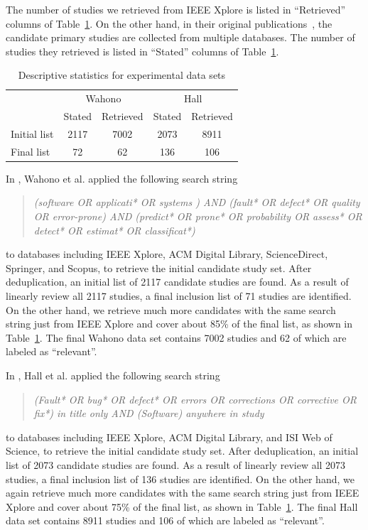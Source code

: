 \documentclass[final,twocolumn,5p]{elsarticle}
\theoremstyle{break}
\begin{document}
The number of studies we retrieved from IEEE Xplore is listed in ``Retrieved'' columns of Table~\ref{tab: number}. On the other hand, in their original publications~\cite{wahono2015systematic,hall2012systematic}, the candidate primary studies are collected from multiple databases. The number of studies they retrieved is listed in ``Stated'' columns of Table~\ref{tab: number}.

\begin{table}
\caption{Descriptive statistics for experimental data sets}
\label{tab: number}
\begin{center}
\begin{tabular}{ |l|c|c|c|c| }
  \hline
   & \multicolumn{2}{|c|}{Wahono} & \multicolumn{2}{|c|}{Hall}\\
  \cline{2-5}
  & Stated & Retrieved & Stated & Retrieved\\
  \hline
  Initial list & 2117 & 7002 & 2073 & 8911\\
  \hline
  Final list & 72 & 62 & 136 & 106 \\
  \hline
\end{tabular}
\end{center}
\end{table}


In \cite{wahono2015systematic}, Wahono et al. applied the following search string
\begin{quote}\textit{(software OR applicati* OR systems ) AND (fault* OR
defect* OR quality OR error-prone) AND (predict*
OR prone* OR probability OR assess* OR detect* OR
estimat* OR classificat*)}
\end{quote}
to databases including IEEE Xplore, ACM Digital Library, ScienceDirect, Springer, and Scopus, to retrieve the initial candidate study set. After deduplication, an initial list of 2117 candidate studies are found. As a result of linearly review all 2117 studies, a final inclusion list of 71 studies are identified. On the other hand, we retrieve much more candidates with the same search string just from IEEE Xplore and cover about 85\% of the final list, as shown in Table~\ref{tab: number}. The final Wahono data set contains 7002 studies and 62 of which are labeled as ``relevant''.

In \cite{hall2012systematic}, Hall et al. applied the following search string
\begin{quote}{\em (Fault* OR bug* OR defect* OR errors OR corrections OR corrective OR fix*) \textit{in title only}
AND (Software) \textit{anywhere in study} }
\end{quote}
to databases including IEEE Xplore, ACM Digital Library, and ISI Web of Science, to retrieve the initial candidate study set. After deduplication, an initial list of 2073 candidate studies are found. As a result of linearly review all 2073 studies, a final inclusion list of 136 studies are identified. On the other hand, we again retrieve much more candidates with the same search string just from IEEE Xplore and cover about 75\% of the final list, as shown in Table~\ref{tab: number}. The final Hall data set contains 8911 studies and 106 of which are labeled as ``relevant''.
\end{document}
